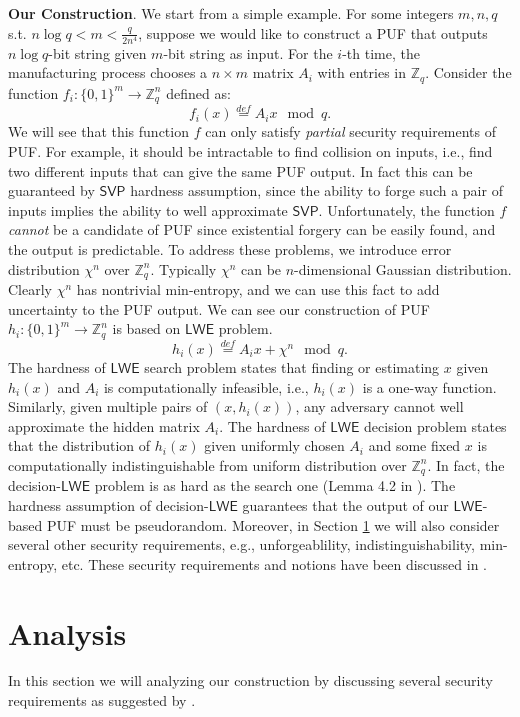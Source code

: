 \documentclass[12pt]{article}
\newcommand{\eqdef}{\stackrel{def}{=}}
\newcommand{\Z}{\mathbb{Z}}
\newcommand{\bits}{\{0,1\}}
\newcommand{\SVP}{\mathsf{SVP}}
\newcommand{\LWE}{\mathsf{LWE}}
\theoremstyle{definition}
\begin{document}
{\bf Our Construction}. We start from a simple example. For some integers $m, n, q$ s.t. $n\log q < m < \frac{q}{2n^4}$, suppose we would like to construct a PUF that outputs $n \log q$-bit string given $m$-bit string as input. For the $i$-th time, the manufacturing process chooses a $n\times m$ matrix $A_i$ with entries in $\Z_q$. Consider the function $f_i : \bits^m \to \Z_q^n$ defined as:
$$f_i(x) \eqdef A_ix \mod q.$$
We will see that this function $f$ can only satisfy \emph{partial} security requirements of PUF. For example, it should be intractable to find collision on inputs, i.e., find two different inputs that can give the same PUF output. In fact this can be guaranteed by $\SVP$ hardness assumption, since the ability to forge such a pair of inputs implies the ability to well approximate $\SVP$. Unfortunately, the function $f$ \emph{cannot} be a candidate of PUF since existential forgery can be easily found, and the output is predictable. To address these problems, we introduce error distribution $\chi^n$ over $\Z_q^n$. Typically $\chi^n$ can be $n$-dimensional Gaussian distribution. Clearly $\chi^n$ has nontrivial min-entropy, and we can use this fact to add uncertainty to the PUF output. We can see our construction of PUF $h_i : \bits^m \to \Z_q^n$ is based on $\LWE$ problem.
$$h_i(x) \eqdef A_ix + \chi^n \mod q.$$
The hardness of $\LWE$ search problem states that finding or estimating $x$ given $h_i(x)$ and $A_i$ is computationally infeasible, i.e., $h_i(x)$ is a one-way function. Similarly, given multiple pairs of $(x, h_i(x))$, any adversary cannot well approximate the hidden matrix $A_i$. The hardness of $\LWE$ decision problem states that the distribution of $h_i(x)$ given uniformly chosen $A_i$ and some fixed $x$ is computationally indistinguishable from uniform distribution over $\Z_q^n$. In fact, the decision-$\LWE$ problem is as hard as the search one (Lemma 4.2 in \cite{regev2009lattices}). The hardness assumption of decision-$\LWE$ guarantees that the output of our $\LWE$-based PUF must be pseudorandom. Moreover, in Section \ref{sec:a} we will also consider several other security requirements, e.g., unforgeablility, indistinguishability, min-entropy, etc. These security requirements and notions have been discussed in \cite{sadeghi2016towards}.

\section{Analysis}
\label{sec:a}
In this section we will analyzing our construction by discussing several security requirements as suggested by \cite{sadeghi2016towards}.
\end{document}
